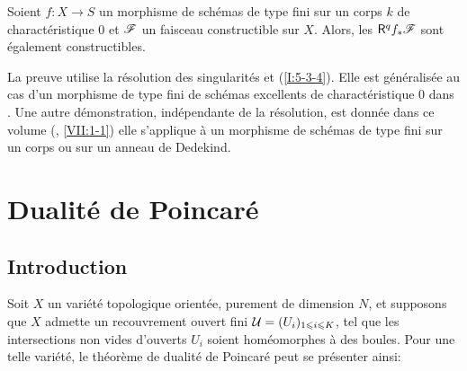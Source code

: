 \documentclass[oneside]{book}
\begin{document}
\begin{theorem}\label{I:5-3-7} %
Soient $f:X\to S$ un morphisme de schémas de type fini sur un corps $k$ de 
charactéristique $0$ et $\mathscr{F}$ un faisceau constructible sur $X$. Alors, les 
$\mathsf{R}^q f_* \mathscr{F}$ sont également constructibles.
\end{theorem}

La preuve utilise la résolution des singularités et (\ref{I:5-3-4}). Elle est 
généralisée au cas d'un morphisme de type fini de schémas excellents de 
charactéristique $0$ dans \cite[XIX.5]{4}. Une autre démonstration, 
indépendante de la résolution, est donnée dans ce volume 
(, \ref{VII:1-1}) 
elle s'applique à un morphisme de schémas de type fini sur un corps ou sur 
un anneau de Dedekind. 




















\section{Dualité de Poincaré}










\subsection{Introduction}\label{I:6-1}

Soit $X$ un variété topologique orientée, purement de dimension $N$, et 
supposons que $X$ admette un recouvrement ouvert fini 
$\mathcal{U}=(U_i)_{1\leqslant i\leqslant K}$, tel que les intersections non vides 
d'ouverts $U_i$ soient homéomorphes à des boules. Pour une telle variété, 
le théorème de dualité de Poincaré peut se présenter ainsi: 
\end{document}
